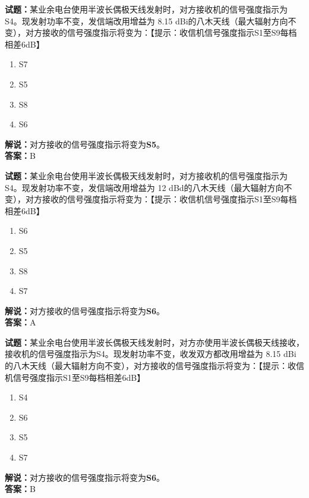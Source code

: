 \documentclass{ctexbook}
\begin{document}

\bigskip


\noindent\textbf{试题：}某业余电台使用半波长偶极天线发射时，对方接收机的信号强度指示为S4。现发射功率不变，发信端改用增益为 8.15 dBi的八木天线（最大辐射方向不变），对方接收的信号强度指示将变为：【提示：收信机信号强度指示S1至S9每档相差6dB】
\begin{enumerate}[leftmargin=3em]
\item S7
\item S5
\item S8
\item S6
\end{enumerate}
\noindent\textbf{解说：}对方接收的信号强度指示将变为\textbf{S5}。\\\noindent\textbf{答案：}B



\bigskip


\noindent\textbf{试题：}某业余电台使用半波长偶极天线发射时，对方接收机的信号强度指示为S4。现发射功率不变，发信端改用增益为 12 dBd的八木天线（最大辐射方向不变），对方接收的信号强度指示将变为：【提示：收信机信号强度指示S1至S9每档相差6dB】
\begin{enumerate}[leftmargin=3em]
\item S6
\item S5
\item S8
\item S7
\end{enumerate}
\noindent\textbf{解说：}对方接收的信号强度指示将变为\textbf{S6}。\\\noindent\textbf{答案：}A



\bigskip


\noindent\textbf{试题：}某业余电台使用半波长偶极天线发射时，对方亦使用半波长偶极天线接收，接收机的信号强度指示为S4。现发射功率不变，收发双方都改用增益为 8.15 dBi的八木天线（最大辐射方向不变），对方接收的信号强度指示将变为：【提示：收信机信号强度指示S1至S9每档相差6dB】
\begin{enumerate}[leftmargin=3em]
\item S4
\item S6
\item S5
\item S7
\end{enumerate}
\noindent\textbf{解说：}对方接收的信号强度指示将变为\textbf{S6}。\\\noindent\textbf{答案：}B


\bigskip
\end{document}
